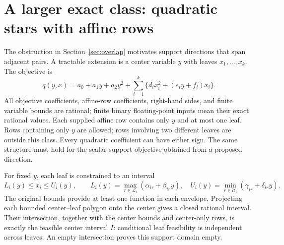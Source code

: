 \section{A larger exact class: quadratic stars with affine rows}\label{sec:star}

The obstruction in Section~\ref{sec:overlap} motivates support directions
that span adjacent pairs. A tractable extension is a center variable $y$
with leaves $x_1,\ldots,x_k$. The objective is
\begin{equation}\label{eq:star}
q(y,x)=a_0+a_1y+a_2y^2+
\sum_{i=1}^k\{d_ix_i^2+(e_iy+f_i)x_i\}.
\end{equation}
All objective coefficients, affine-row coefficients, right-hand sides,
and finite variable bounds are rational; finite binary floating-point
inputs mean their exact rational values. Each supplied affine row contains
only $y$ and at most one leaf. Rows containing only $y$ are allowed;
rows involving two different leaves are outside this class. Every
quadratic coefficient can have either sign. The same structure must hold
for the scalar support objective obtained from a proposed direction.

For fixed $y$, each leaf is constrained to an interval
\begin{equation}\label{eq:leaf-bounds}
L_i(y)\le x_i\le U_i(y),\qquad
L_i(y)=\max_{r\in\mathcal L_i}(\alpha_{ir}+\beta_{ir}y),\quad
U_i(y)=\min_{r\in\mathcal U_i}(\gamma_{ir}+\delta_{ir}y).
\end{equation}
The original bounds provide at least one function in each envelope.
Projecting each bounded center--leaf polygon onto the center gives a
closed rational interval. Their intersection, together with the center
bounds and center-only rows, is exactly the feasible center interval
$I$: conditional leaf feasibility is independent across leaves. An
empty intersection proves this support domain empty.

